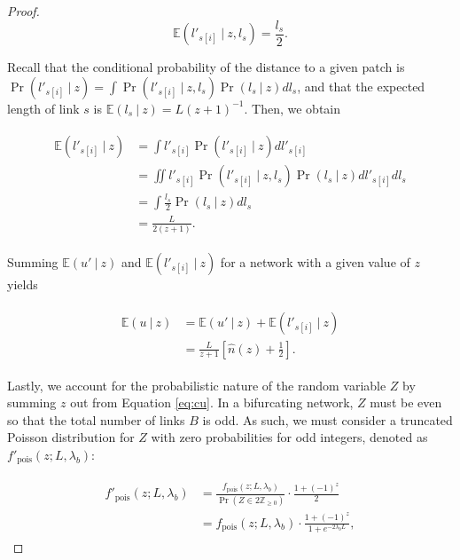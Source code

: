 \documentclass[11pt, class=article, crop=false]{standalone}
\theoremstyle{definition}
\begin{document}
\begin{proof}
\begin{equation}
    \mathbb{E}(l'_{s[i]}~|~z, l_s) = \frac{l_s}{2}.
\end{equation}

Recall that the conditional probability of the distance to a given patch is $\Pr(l'_{s[i]}~|~z)= \int \Pr(l'_{s[i]}~|~z, l_s) \Pr(l_s~|~z)d l_s$, and that the expected length of link $s$ is $\mathbb{E}(l_s~|~z) = L(z+1)^{-1}$.
Then, we obtain 

\begin{align}
    \begin{split}
        \mathbb{E}(l'_{s[i]}~|~z)
        &= \int l'_{s[i]} \Pr(l'_{s[i]}~|~z) dl'_{s[i]}\\
        &= \iint l'_{s[i]} \Pr(l'_{s[i]}~|~z, l_s) \Pr(l_s~|~z) dl'_{s[i]} dl_s \\
        &= \int \frac{l_s}{2} \Pr(l_s~|~z) dl_s \\
        &= \frac{L}{2(z + 1)}.
    \end{split}
\end{align}

Summing $\mathbb{E}(u' ~|~ z)$ and $\mathbb{E}(l'_{s[i]}~|~z)$ for a network with a given value of $z$ yields

\begin{align}
    \begin{split}
        \mathbb{E}(u ~|~ z) 
        &= \mathbb{E}(u' ~|~ z) + \mathbb{E}(l'_{s[i]}~|~z)\\
        &= \frac{L}{z+1} \left[ \hat{n}(z) + \frac{1}{2} \right].
    \end{split}
    \label{eq:cu}
\end{align}

Lastly, we account for the probabilistic nature of the random variable $Z$ by summing $z$ out from Equation \ref{eq:cu}.
In a bifurcating network, $Z$ must be even so that the total number of links $B$ is odd.
As such, we must consider a truncated Poisson distribution for $Z$ with zero probabilities for odd integers, denoted as $f'_{\text{pois}}(z; L, \lambda_b)$:

\begin{align}
    \begin{split}
    f'_{\text{pois}}(z; L, \lambda_b) 
    &= \frac{f_{\text{pois}}(z; L, \lambda_b)}{\Pr(Z \in 2\mathbb{Z}_{\ge 0})} \cdot \frac{1 + (-1)^{z}}{2}\\
    &= f_{\text{pois}}(z; L, \lambda_b) \cdot \frac{1 + (-1)^{z}}{1 + e^{-2\lambda_b L}},
    \end{split}
    \label{eq:tpois}
\end{align}


\end{proof}
\end{document}

